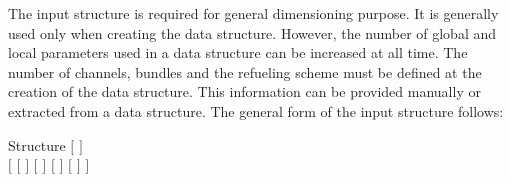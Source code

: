 The  input structure is required for general dimensioning purpose. It is generally used only when creating the  data structure.
However, the number of global and local parameters used in a  data structure can be increased at all time. The number of channels, bundles and the
refueling scheme must be defined at the creation of the  data structure. This information can be provided manually or extracted from a 
data structure. The general form of the  input structure follows:

\begin{DataStructure}{Structure }
$[$   $]$ \\
$[$  
$[$     $]$ $[$   $]$ 
$[$     $]$ $[$   $]$  $]$ 
\end{DataStructure}

